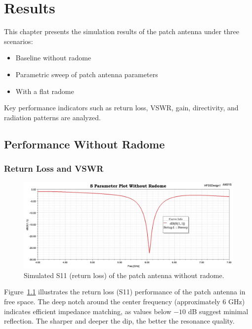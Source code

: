 \chapter{Results}

This chapter presents the simulation results of the patch antenna under three scenarios:
\begin{itemize}
    \item Baseline without radome
    \item Parametric sweep of patch antenna parameters
    \item With a flat radome
\end{itemize}
Key performance indicators such as return loss, VSWR, gain, directivity, and radiation patterns are analyzed.

\section{Performance Without Radome}

\subsection{Return Loss and VSWR}

\begin{figure}[H]
    \centering
    \includegraphics[width=1.0\textwidth]{figures/without_radome/s11.jpeg}
    \caption{Simulated S11 (return loss) of the patch antenna without radome.}
    \label{fig:res-without-s11}
\end{figure}

Figure~\ref{fig:res-without-s11} illustrates the return loss (S11) performance of the patch antenna in free space. The deep notch around the center frequency (approximately 6 GHz) indicates efficient impedance matching, as values below $-10$ dB suggest minimal reflection. The sharper and deeper the dip, the better the resonance quality.

